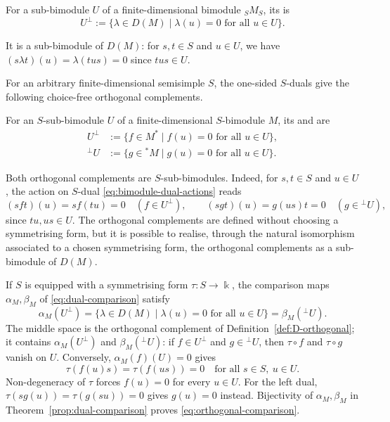 \begin{definition}\label{def:D-orthogonal}
For a sub-bimodule $U$ of a finite-dimensional bimodule ${}_SM_S$, its  is
\[
U^\perp:=\{\lambda\in D(M)\mid\lambda(u)=0\text{ for all }u\in U\}.
\]
\end{definition}

It is a sub-bimodule of $D(M)$: for $s,t\in S$ and $u\in U$, we have $(s\lambda t)(u)=\lambda(tus)=0$ since $tus\in U$.

\begin{advanced}
For an arbitrary finite-dimensional semisimple $S$, the one-sided $S$-duals give the following choice-free orthogonal complements.

\begin{definition}\label{def:orthogonals}
For an $S$-sub-bimodule $U$ of a finite-dimensional $S$-bimodule $M$, its  and  are
\[
\begin{aligned}
U^\perp&:=\{f\in M^*\mid f(u)=0\text{ for all }u\in U\},\\
{}^\perp U&:=\{g\in{}^*M\mid g(u)=0\text{ for all }u\in U\}.
\end{aligned}
\]
\end{definition}

Both orthogonal complements are $S$-sub-bimodules.
Indeed, for $s,t\in S$ and $u\in U$, the action on $S$-dual \eqref{eq:bimodule-dual-actions} reads
\[
(sft)(u)=sf(tu)=0\quad(f\in U^\perp),\qquad
(sgt)(u)=g(us)t=0\quad(g\in{}^\perp U),
\]
since $tu,us\in U$.
The orthogonal complements are defined without choosing a symmetrising form, but it is possible to realise, through the natural isomorphism associated to a chosen symmetrising form, the orthogonal complements as a sub-bimodule of $D(M)$.

If $S$ is equipped with a symmetrising form $\tau:S\to\Bbbk$, the comparison maps $\alpha_M,\beta_M$ of \eqref{eq:dual-comparison} satisfy
\begin{equation}\label{eq:orthogonal-comparison}
\alpha_M(U^\perp)=\{\lambda\in D(M)\mid\lambda(u)=0\text{ for all }u\in U\}=\beta_M({}^\perp U)
.
\end{equation}
The middle space is the orthogonal complement of Definition~\ref{def:D-orthogonal}; it contains $\alpha_M(U^\perp)$ and $\beta_M({}^\perp U)$: if $f\in U^\perp$ and $g\in{}^\perp U$, then $\tau\circ f$ and $\tau\circ g$ vanish on $U$.
Conversely, $\alpha_M(f)(U)=0$ gives
\[
\tau(f(u)s)=\tau(f(us))=0
\quad\text{for all }s\in S,\ u\in U.
\]
Non-degeneracy of $\tau$ forces $f(u)=0$ for every $u\in U$.
For the left dual, $\tau(sg(u))=\tau(g(su))=0$ gives $g(u)=0$ instead.
Bijectivity of $\alpha_M,\beta_M$ in Theorem~\ref{prop:dual-comparison} proves \eqref{eq:orthogonal-comparison}.
\end{advanced}

